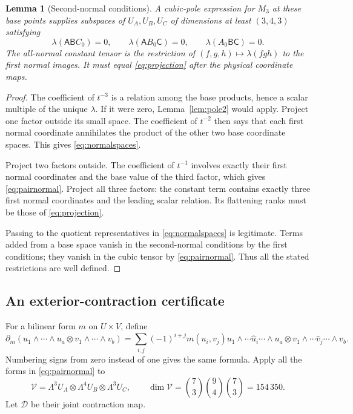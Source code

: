 \documentclass[11pt]{article}
\newtheorem{lemma}[theorem]{Lemma}
\theoremstyle{definition}\newtheorem{definition}[theorem]{Definition}
\theoremstyle{remark}\newtheorem{remark}[theorem]{Remark}
\begin{document}
\begin{lemma}[Second-normal conditions]\label{lem:normal}
A cubic-pole expression for $M_3$ at these base points supplies subspaces of
$U_A,U_B,U_C$ of dimensions at least $(3,4,3)$ satisfying
\begin{equation}\label{eq:pairnormal}
 \lambda(\mathsf A\mathsf B C_0)=0,\qquad
 \lambda(\mathsf A B_0\mathsf C)=0,\qquad
 \lambda(A_0\mathsf B\mathsf C)=0.
\end{equation}
The all-normal constant tensor is the restriction of
$(f,g,h)\mapsto\lambda(fgh)$ to the first normal images. It must equal
\eqref{eq:projection} after the physical coordinate maps.
\end{lemma}
\begin{proof}
The coefficient of $t^{-3}$ is a relation among the base products, hence a
scalar multiple of the unique $\lambda$. If it were zero, Lemma~\ref{lem:pole2}
would apply. Project one factor outside its small space. The coefficient of
$t^{-2}$ then says that each first normal coordinate annihilates the product
of the other two base coordinate spaces. This gives \eqref{eq:normalspaces}.

Project two factors outside. The coefficient of $t^{-1}$ involves exactly
their first normal coordinates and the base value of the third factor,
which gives \eqref{eq:pairnormal}. Project all three factors: the constant
term contains exactly three first normal coordinates and the leading
scalar relation. Its flattening ranks must be those of \eqref{eq:projection}.

Passing to the quotient representatives in \eqref{eq:normalspaces} is
legitimate. Terms added from a base space vanish in the second-normal
conditions by the first conditions; they vanish in the cubic tensor by
\eqref{eq:pairnormal}. Thus all the stated restrictions are well defined.
\end{proof}

\subsection{An exterior-contraction certificate}

For a bilinear form $m$ on $U\times V$, define
\[
 \partial_m(u_1\wedge\cdots\wedge u_a\otimes
             v_1\wedge\cdots\wedge v_b)
 =\sum_{i,j}(-1)^{i+j}m(u_i,v_j)
     u_1\wedge\cdots\widehat u_i\cdots\wedge u_a
       \otimes v_1\wedge\cdots\widehat v_j\cdots\wedge v_b.
\]
Numbering signs from zero instead of one gives the same formula. Apply all
the forms in \eqref{eq:pairnormal} to
\begin{equation}\label{eq:exteriordomain}
 \mathcal V=\Lambda^3U_A\otimes\Lambda^4U_B\otimes\Lambda^3U_C,
 \qquad\dim\mathcal V=\binom73\binom94\binom73=154\,350.
\end{equation}
Let $\mathcal D$ be their joint contraction map.
\end{document}
